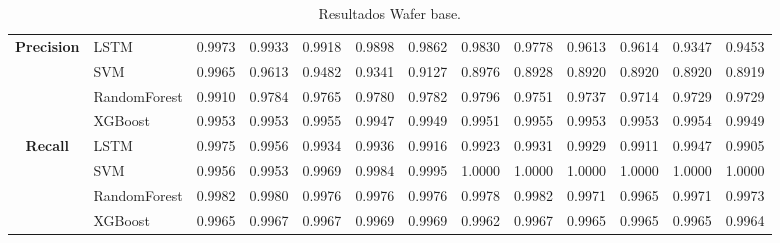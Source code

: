 \begin{table}[h]
\begin{adjustbox}{max width=15cm}
\begin{tabular}{|c|l|r|r|r|r|r|r|r|r|r|r|r|}
			\hline
			\textbf{Precision} & LSTM &  0.9973 &  0.9933 &  0.9918 &  0.9898 &  0.9862 &  0.9830 &  0.9778 &  0.9613 &  0.9614 &  0.9347 &  0.9453 \\
			& SVM &  0.9965 &  0.9613 &  0.9482 &  0.9341 &  0.9127 &  0.8976 &  0.8928 &  0.8920 &  0.8920 &  0.8920 &  0.8919 \\
			& RandomForest &  0.9910 &  0.9784 &  0.9765 &  0.9780 &  0.9782 &  0.9796 &  0.9751 &  0.9737 &  0.9714 &  0.9729 &  0.9729 \\
			& XGBoost &  0.9953 &  0.9953 &  0.9955 &  0.9947 &  0.9949 &  0.9951 &  0.9955 &  0.9953 &  0.9953 &  0.9954 &  0.9949 \\
			\hline
			\textbf{Recall} & LSTM &  0.9975 &  0.9956 &  0.9934 &  0.9936 &  0.9916 &  0.9923 &  0.9931 &  0.9929 &  0.9911 &  0.9947 &  0.9905 \\
			& SVM &  0.9956 &  0.9953 &  0.9969 &  0.9984 &  0.9995 &  1.0000 &  1.0000 &  1.0000 &  1.0000 &  1.0000 &  1.0000 \\
			& RandomForest &  0.9982 &  0.9980 &  0.9976 &  0.9976 &  0.9976 &  0.9978 &  0.9982 &  0.9971 &  0.9965 &  0.9971 &  0.9973 \\
			& XGBoost &  0.9965 &  0.9967 &  0.9967 &  0.9969 &  0.9969 &  0.9962 &  0.9967 &  0.9965 &  0.9965 &  0.9965 &  0.9964 \\
			\hline
		\end{tabular}
	\end{adjustbox}
	\caption{Resultados Wafer base.}
	\label{tab:Wafer_base}
\end{table}

